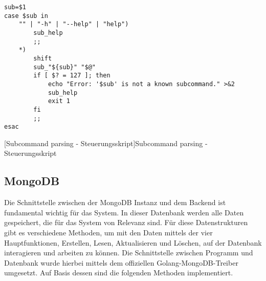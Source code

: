 \begin{verbatim}
sub=$1
case $sub in
	"" | "-h" | "--help" | "help")
		sub_help
		;;
	*)
		shift
		sub_"${sub}" "$@"
		if [ $? = 127 ]; then
			echo "Error: '$sub' is not a known subcommand." >&2
			sub_help
			exit 1
		fi
		;;
esac
\end{verbatim}
[Subcommand parsing - Steuerungsskript]{Subcommand parsing - Steuerungsskript \cite{shgist}}
\label{code:subcommands}

\newpage

\subsection{MongoDB}

Die Schnittstelle zwischen der MongoDB Instanz und dem Backend ist fundamental wichtig für das System. In dieser Datenbank werden alle Daten gespeichert, die für das System von Relevanz sind. Für diese Datenstrukturen gibt es verschiedene Methoden, um mit den Daten mittels der vier Hauptfunktionen, Erstellen, Lesen, Aktualisieren und Löschen, auf der Datenbank interagieren und arbeiten zu können. Die Schnittstelle zwischen Programm und Datenbank wurde hierbei mittels dem offiziellen Golang-MongoDB-Treiber umgesetzt. \cite{mongogo} Auf Basis dessen sind die folgenden Methoden implementiert.

